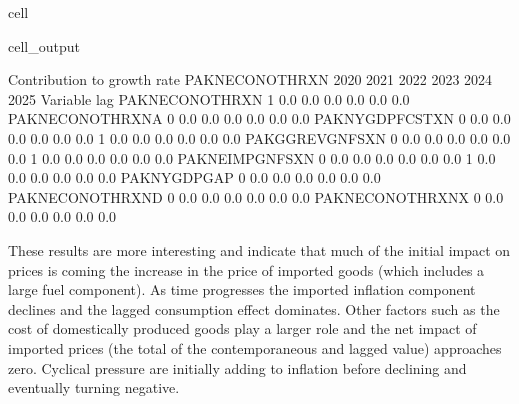 \documentclass[letterpaper,10pt,english]{jupyterBook}
\begin{document}
\begin{sphinxuseclass}{cell}
\begin{sphinxVerbatimOutput}
\begin{sphinxuseclass}{cell_output}
\begin{sphinxVerbatim}[commandchars=\\\{\}]
 Contribution to growth rate PAKNECONOTHRXN
                            2020        2021        2022        2023        2024        2025
Variable         lag                                                                        
PAKNECONOTHRXN   \PYGZhy{}1         0.0\PYGZpc{}        0.0\PYGZpc{}        0.0\PYGZpc{}        0.0\PYGZpc{}        0.0\PYGZpc{}        0.0\PYGZpc{}
PAKNECONOTHRXN\PYGZus{}A  0         0.0\PYGZpc{}        0.0\PYGZpc{}        0.0\PYGZpc{}        0.0\PYGZpc{}        0.0\PYGZpc{}        0.0\PYGZpc{}
PAKNYGDPFCSTXN    0        \PYGZhy{}0.0\PYGZpc{}       \PYGZhy{}0.0\PYGZpc{}       \PYGZhy{}0.0\PYGZpc{}        0.0\PYGZpc{}        0.0\PYGZpc{}        0.0\PYGZpc{}
                 \PYGZhy{}1         0.0\PYGZpc{}        0.0\PYGZpc{}        0.0\PYGZpc{}        0.0\PYGZpc{}       \PYGZhy{}0.0\PYGZpc{}       \PYGZhy{}0.0\PYGZpc{}
PAKGGREVGNFSXN    0         0.0\PYGZpc{}        0.0\PYGZpc{}        0.0\PYGZpc{}        0.0\PYGZpc{}        0.0\PYGZpc{}        0.0\PYGZpc{}
                 \PYGZhy{}1         0.0\PYGZpc{}        0.0\PYGZpc{}        0.0\PYGZpc{}        0.0\PYGZpc{}        0.0\PYGZpc{}        0.0\PYGZpc{}
PAKNEIMPGNFSXN    0         0.0\PYGZpc{}        0.0\PYGZpc{}        0.0\PYGZpc{}        0.0\PYGZpc{}        0.0\PYGZpc{}        0.0\PYGZpc{}
                 \PYGZhy{}1         0.0\PYGZpc{}       \PYGZhy{}0.0\PYGZpc{}       \PYGZhy{}0.0\PYGZpc{}       \PYGZhy{}0.0\PYGZpc{}       \PYGZhy{}0.0\PYGZpc{}       \PYGZhy{}0.0\PYGZpc{}
PAKNYGDPGAP\PYGZus{}      0        \PYGZhy{}0.0\PYGZpc{}        0.0\PYGZpc{}        0.0\PYGZpc{}        0.0\PYGZpc{}        0.0\PYGZpc{}        0.0\PYGZpc{}
PAKNECONOTHRXN\PYGZus{}D  0         0.0\PYGZpc{}        0.0\PYGZpc{}        0.0\PYGZpc{}        0.0\PYGZpc{}        0.0\PYGZpc{}        0.0\PYGZpc{}
PAKNECONOTHRXN\PYGZus{}X  0         0.0\PYGZpc{}        0.0\PYGZpc{}        0.0\PYGZpc{}        0.0\PYGZpc{}        0.0\PYGZpc{}        0.0\PYGZpc{}
\end{sphinxVerbatim}

\end{sphinxuseclass}\end{sphinxVerbatimOutput}

\end{sphinxuseclass}
\sphinxAtStartPar
These results are more interesting and indicate that much of the initial impact on prices is coming the increase in the price of imported goods (which includes a large fuel component). As time progresses the imported inflation component declines and the lagged consumption effect dominates.  Other factors such as the cost of domestically produced goods play a larger role and the net impact of imported prices (the total of the contemporaneous and lagged value) approaches zero. Cyclical pressure are initially adding to inflation before declining and eventually turning negative.
\end{document}
